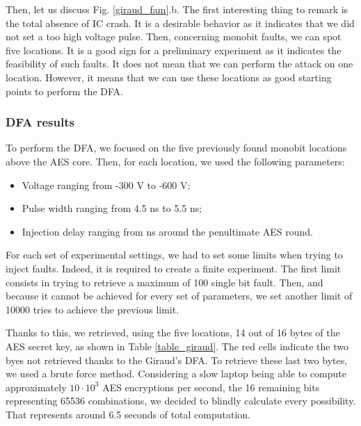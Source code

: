 			Then, let us discuss Fig. \ref{giraud_fam}.b.
			The first interesting thing to remark is the total absence of IC crash.
			It is a desirable behavior as it indicates that we did not set a too high voltage pulse.
			Then, concerning monobit faults, we can spot five locations.
			It is a good sign for a preliminary experiment as it indicates the feasibility of such faults.
			It does not mean that we can perform the attack on one location.
			However, it means that we can use these locations as good starting points to perform the DFA.

		\subsubsection{DFA results}
			To perform the DFA, we focused on the five previously found monobit locations above the AES core.
			Then, for each location, we used the following parameters:
			\begin{itemize}
				\item Voltage ranging from -300 V to -600 V;
				\item Pulse width ranging from 4.5 ns to 5.5 ns;
				\item Injection delay ranging from  ns around the penultimate AES round.
			\end{itemize}
			For each set of experimental settings, we had to set some limits when trying to inject faults.
			Indeed, it is required to create a finite experiment.
			The first limit consists in trying to retrieve a maximum of 100 single bit fault.
			Then, and because it cannot be achieved for every set of parameters, we set another limit of 10000 tries to achieve the previous limit.
			
			Thanks to this, we retrieved, using the five locations, 14 out of 16 bytes of the AES secret key, as shown in Table \ref{table_giraud}.
			The red cells indicate the two byes not retrieved thanks to the Giraud's DFA.
			To retrieve these last two bytes, we used a brute force method.
			Considering a slow laptop being able to compute approximately $10 \cdot 10^3$ AES encryptions per second, the 16 remaining bits representing 65536 combinations, we decided to blindly calculate every possibility.
			That represents around 6.5 seconds of total computation.

